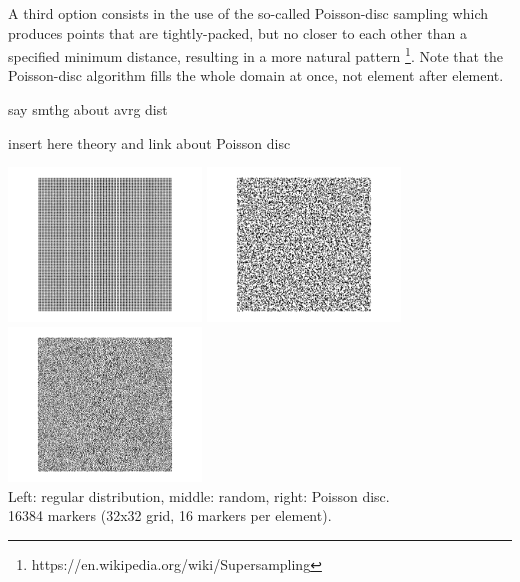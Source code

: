 A third option consists in the use of the so-called Poisson-disc sampling which 
produces points that are tightly-packed, but no closer to each other than 
a specified minimum distance, resulting in a more natural pattern 
\footnote{https://en.wikipedia.org/wiki/Supersampling}. Note that 
the Poisson-disc algorithm fills the whole domain at once, not element after element.

{\color{red} say smthg about avrg dist}  

{\color{red} insert here theory and link about Poisson disc }

\begin{center}
\includegraphics[width=5.134cm]{python_codes/fieldstone_13/images/markers_reg} 
\includegraphics[width=5.134cm]{python_codes/fieldstone_13/images/markers_rand} 
\includegraphics[width=5.134cm]{python_codes/fieldstone_13/images/markers_pd} \\
{\small Left: regular distribution, middle: random, right: Poisson disc.\\
 16384 markers (32x32 grid, 16 markers per element).}
\end{center}



